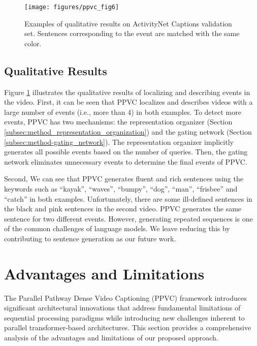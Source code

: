 %

\begin{figure}[!tp]
  \centering
  \texttt{[image: figures/ppvc\_fig6]}
  \caption{
    Examples of qualitative results on ActivityNet Captions validation set.
    Sentences corresponding to the event are matched with the same color.
  }
  \label{fig:eval_qualitative_results}
\end{figure}

\subsection{Qualitative Results}
\label{subsec:experiments-qual_res}

Figure \ref{fig:eval_qualitative_results} illustrates the qualitative results of localizing and describing events in the video.
First, it can be seen that PPVC localizes and describes videos with a large number of events (i.e., more than 4) in both examples.
To detect more events, PPVC has two mechanisms: the representation organizer (Section \ref{subsec:method_representation_organization}) and the gating network (Section \ref{subsec:method-gating_network}).
The representation organizer implicitly generates all possible events based on the number of queries.
Then, the gating network eliminates unnecessary events to determine the final events of PPVC.

Second, We can see that PPVC generates fluent and rich sentences using the keywords such as ``kayak'', ``waves'', ``bumpy'', ``dog'', ``man'', ``frisbee'' and ``catch'' in both examples.
Unfortunately, there are some ill-defined sentences in the black and pink sentences in the second video.
PPVC generates the same sentence for two different events.
However, generating repeated sequences is one of the common challenges of language models.
We leave reducing this by contributing to sentence generation as our future work.

\section{Advantages and Limitations}
\label{sec:advantages_limitations}

The Parallel Pathway Dense Video Captioning (PPVC) framework introduces significant architectural innovations that address fundamental limitations of sequential processing paradigms while introducing new challenges inherent to parallel transformer-based architectures. This section provides a comprehensive analysis of the advantages and limitations of our proposed approach.

